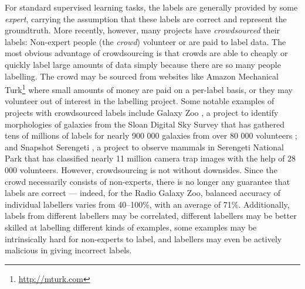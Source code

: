     For standard supervised learning tasks, the labels are generally provided by
    some \emph{expert}, carrying the assumption that these labels are correct
    and represent the groundtruth. More recently, however, many projects have
    \emph{crowdsourced} their labels: Non-expert people (the \emph{crowd})
    volunteer or are paid to label data. The most obvious advantage of
    crowdsourcing is that crowds are able to cheaply or quickly label large
    amounts of data simply because there are so many people labelling. The crowd
    may be sourced from websites like Amazon Mechanical
    Turk\footnote{\url{http://mturk.com}} where small amounts of money are paid
    on a per-label basis, or they may volunteer out of interest in the labelling
    project. Some notable examples of projects with crowdsourced labels include
    Galaxy Zoo \citep{lintott08}, a project to identify morphologies of galaxies
    from the Sloan Digital Sky Survey that has gathered tens of millions of
    labels for nearly 900 000 galaxies from over 80 000 volunteers
    \citep{lintott11}; and Snapshot Serengeti \citep{swanson15}, a project to
    observe mammals in Serengeti National Park that has classified nearly 11
    million camera trap images with the help of 28 000 volunteers. However,
    crowdsourcing is not without downsides. Since the crowd necessarily consists
    of non-experts, there is no longer any guarantee that labels are correct ---
    indeed, for the Radio Galaxy Zoo, balanced accuracy of individual labellers
    varies from 40--100\%, with an average of 71\%. Additionally, labels from
    different labellers may be correlated, different labellers may be better
    skilled at labelling different kinds of examples, some examples may be
    intrinsically hard for non-experts to label, and labellers may even be
    actively malicious in giving incorrect labels.
